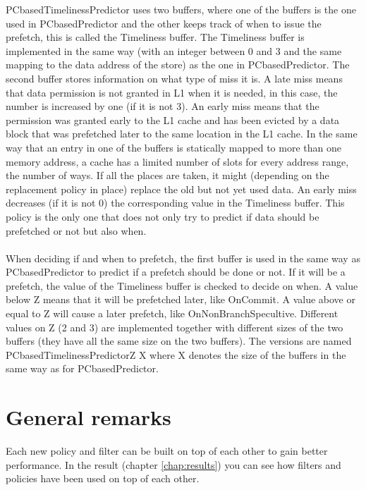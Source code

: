 PCbasedTimelinessPredictor uses two buffers, where one of the buffers is the one used
in PCbasedPredictor and the other keeps track of when to issue the prefetch, this is
called the Timeliness buffer. The Timeliness buffer is implemented in the same way
(with an integer between 0 and 3 and the same mapping to the data address of the
store) as the one in PCbasedPredictor. The second buffer stores information on what
type of miss it is. A late miss means that data permission is not granted in L1 when
it is needed, in this case, the number is increased by one (if it is not 3). An early miss
means that the permission was granted early to the L1 cache and has been evicted by
a data block that was prefetched later to the same location in the L1 cache. In the
same way that an entry in one of the buffers is statically mapped to more than one
memory address, a cache has a limited number of slots for every address range, the
number of ways. If all the places are taken, it might (depending on the replacement
policy in place) replace the old but not yet used data. An early miss decreases (if it
is not 0) the corresponding value in the Timeliness buffer. This policy is the only one
that does not only try to predict if data should be prefetched or not but also when.
\\ \\
When deciding if and when to prefetch, the first buffer is used in the same way as
PCbasedPredictor to predict if a prefetch should be done or not. If it will be a prefetch,
the value of the Timeliness buffer is checked to decide on when. A value below Z
means that it will be prefetched later, like OnCommit. A value above or equal to Z
will cause a later prefetch, like OnNonBranchSpecultive. Different values on Z (2 and
3) are implemented together with different sizes of the two buffers (they have all the
same size on the two buffers). The versions are named PCbasedTimelinessPredictorZ
X where X denotes the size of the buffers in the same way as for PCbasedPredictor.

\section{General remarks}
Each new policy and filter can be built on top of each other to gain better performance. In the result (chapter \ref{chap:results}) you can see how filters and policies have been used on top of each other.
